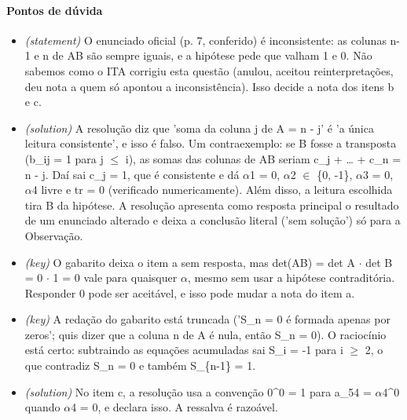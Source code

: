 \documentclass{article}%
\begin{document}
\paragraph{Pontos de dúvida}%
\begin{itemize}%
\item%
\textit{(statement)} O enunciado oficial (p. 7, conferido) é inconsistente: as colunas n-1 e n de AB são sempre iguais, e a hipótese pede que valham 1 e 0. Não sabemos como o ITA corrigiu esta questão (anulou, aceitou reinterpretações, deu nota a quem só apontou a inconsistência). Isso decide a nota dos itens b e c.%
\item%
\textit{(solution)} A resolução diz que 'soma da coluna j de A = n - j' é 'a única leitura consistente', e isso é falso. Um contraexemplo: se B fosse a transposta (b\_ij = 1 para j $\leq$ i), as somas das colunas de AB seriam c\_j + \ldots{} + c\_n = n - j. Daí sai c\_j = 1, que é consistente e dá $\alpha$1 = 0, $\alpha$2 $\in$ \{0, -1\}, $\alpha$3 = 0, $\alpha$4 livre e tr = 0 (verificado numericamente). Além disso, a leitura escolhida tira B da hipótese. A resolução apresenta como resposta principal o resultado de um enunciado alterado e deixa a conclusão literal ('sem solução') só para a Observação.%
\item%
\textit{(key)} O gabarito deixa o item a sem resposta, mas det(AB) = det A $\cdot$ det B = 0 $\cdot$ 1 = 0 vale para quaisquer $\alpha$, mesmo sem usar a hipótese contraditória. Responder 0 pode ser aceitável, e isso pode mudar a nota do item a.%
\item%
\textit{(key)} A redação do gabarito está truncada ('S\_n = 0 é formada apenas por zeros'; quis dizer que a coluna n de A é nula, então S\_n = 0). O raciocínio está certo: subtraindo as equações acumuladas sai S\_i = -1 para i $\geq$ 2, o que contradiz S\_n = 0 e também S\_\{n-1\} = 1.%
\item%
\textit{(solution)} No item c, a resolução usa a convenção 0\^{}0 = 1 para a\_54 = $\alpha$4\^{}0 quando $\alpha$4 = 0, e declara isso. A ressalva é razoável.%
\end{itemize}%
\end{document}
